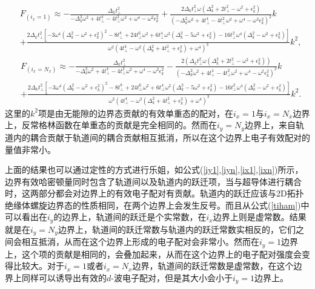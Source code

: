 \begin{equation}
\begin{aligned}
&F_{(i_x=1)}\approx-\frac{\Delta_k  t_\perp^2}{-\Delta_k ^2 \omega ^2+4 t_\perp^4-4 t_\perp^2 \omega ^2+\omega ^4-\omega ^2 \epsilon_k ^2}+\frac{2 \Delta_k   t_\perp^2 \omega  \left(\Delta_k ^2+2 t_\perp^2-\omega ^2+\epsilon_k ^2\right)}{\left(-\Delta_k ^2 \omega ^2+4 t_\perp^4-4 t_\perp^2 \omega ^2+\omega ^4-\omega ^2 \epsilon_k ^2\right)^2}k\\
&+\frac{2 \Delta_k   t_\perp^2 \left[-3 \omega ^4 \left(\Delta_k ^2-\omega ^2+\epsilon_k ^2\right)^2-8 t_\perp^8+24 t_\perp^6 \omega ^2+6 t_\perp^4 \omega ^2 \left(\Delta_k ^2-5 \omega ^2+\epsilon_k ^2\right)-16 t_\perp^2 \omega ^4 \left(\Delta_k ^2-\omega ^2+\epsilon_k ^2\right)\right]}{\omega ^2 \left(4 t_\perp^4-\omega ^2 \left(\Delta_k ^2+4 t_\perp^2+\epsilon_k ^2\right)+\omega ^4\right)^3}k^2,
\end{aligned}
\end{equation}
\begin{equation}
\begin{aligned}
&F_{(i_x=N_x)}\approx-\frac{\Delta_k  t_\perp^2}{-\Delta_k ^2 \omega ^2+4 t_\perp^4-4 t_\perp^2 \omega ^2+\omega ^4-\omega ^2 \epsilon_k ^2}-\frac{2  \left(\Delta_k  t_\perp^2 \omega  \left(\Delta_k ^2+2 t_\perp^2-\omega ^2+\epsilon_k ^2\right)\right)}{\left(-\Delta_k ^2 \omega ^2+4 t_\perp^4-4 t_\perp^2 \omega ^2+\omega ^4-\omega ^2 \epsilon_k ^2\right)^2}k\\
&+\frac{2 \Delta_k   t_\perp^2 \left[-3 \omega ^4 \left(\Delta_k ^2-\omega ^2+\epsilon_k ^2\right)^2-8 t_\perp^8+24 t_\perp^6 \omega ^2+6 t_\perp^4 \omega ^2 \left(\Delta_k ^2-5 \omega ^2+\epsilon_k ^2\right)-16 t_\perp^2 \omega ^4 \left(\Delta_k ^2-\omega ^2+\epsilon_k ^2\right)\right]}{\omega ^2 \left(4 t_\perp^4-\omega ^2 \left(\Delta_k ^2+4 t_\perp^2+\epsilon_k ^2\right)+\omega ^4\right)^3}k^2.
\end{aligned}
\end{equation}
这里的$k^2$项是由无能隙的边界态贡献的有效单重态的配对，在$i_x=1$与$i_x=N_x$边界上，反常格林函数在单重态的贡献是完全相同的。然而在$i_y=N_y$边界上，来自轨道内的耦合贡献于轨道间的耦合贡献相互抵消，所以在这个边界上电子有效配对的量值非常小。

上面的结果也可以通过定性的方式进行乐姐，如公式(\ref{iy1},\ref{iyn},\ref{ix1},\ref{ixn})所示，边界有效哈密顿量同时包含了轨道间以及轨道内的跃迁项，当与超导体进行耦合时，这两部分都会对边界上的有效电子配对有贡献。轨道内的跃迁应该与2D拓扑绝缘体螺旋边界态的性质相同，在两个边界上会发生反号。而且从公式(\ref{tiham})中可以看出在$i_y$的边界上，轨道间的跃迁是个实常数，在$i_x$边界上则是虚常数。结果就是在$i_y=N_y$边界上，轨道间的跃迁常数与轨道内的跃迁常数实相反的，它们之间会相互抵消，从而在这个边界上形成的电子配对会非常小。然而在$i_y=1$边界上，这个项的贡献是相同的，会叠加起来，从而在这个边界上的电子配对强度会变得比较大。对于$i_x=1$或者$i_x=N_x$边界，轨道间的跃迁常数是虚常数，在这个边界上同样可以诱导出有效的$d$-波电子配对，但是其大小会小于$i_y=1$边界上。
